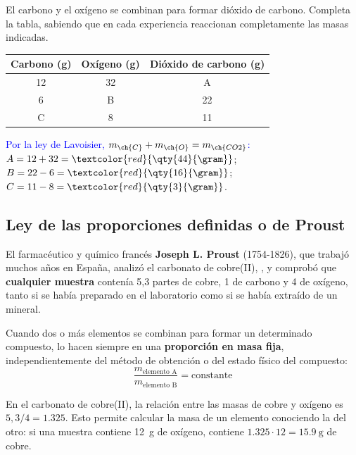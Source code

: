 \begin{exercise}
    El carbono y el oxígeno se combinan para formar dióxido de carbono. Completa la tabla, sabiendo que en cada experiencia
    reaccionan completamente las masas indicadas.
    \begin{center}
        \begin{tabular}{@{}ccc@{}}
            \toprule
            \textbf{Carbono (g)} & \textbf{Oxígeno (g)} & \textbf{Dióxido de carbono (g)} \\
            \midrule
            12 & 32 & A \\[3pt]
            6 & B & 22 \\[3pt]
            C & 8 & 11 \\
            \bottomrule
        \end{tabular}
    \end{center}
    \begin{solu}
        \textcolor{blue}{Por la ley de Lavoisier, \(m_{\ch{C}} + m_{\ch{O}} = m_{\ch{CO2}}\):}
        \(A = 12 + 32 = \textcolor{red}{\qty{44}{\gram}}\); \(B = 22 - 6 = \textcolor{red}{\qty{16}{\gram}}\);
        \(C = 11 - 8 = \textcolor{red}{\qty{3}{\gram}}\).
    \end{solu}
\end{exercise}

\subsection{Ley de las proporciones definidas o de Proust}

El farmacéutico y químico francés \textbf{Joseph L. Proust} (1754-1826), que trabajó muchos años en España, analizó el
carbonato de cobre(II), , y comprobó que \textbf{cualquier muestra} contenía 5,3 partes de cobre, 1 de carbono y 4
de oxígeno, tanto si se había preparado en el laboratorio como si se había extraído de un mineral.

\begin{definition}
    Cuando dos o más elementos se combinan para formar un determinado compuesto, lo hacen siempre en una
    \textbf{proporción en masa fija}, independientemente del método de obtención o del estado físico del compuesto:
    \[ \frac{m_{\text{elemento A}}}{m_{\text{elemento B}}} = \text{constante} \]
\end{definition}

En el carbonato de cobre(II), la relación entre las masas de cobre y oxígeno es \(5{,}3/4 = \num{1.325}\). Esto permite
calcular la masa de un elemento conociendo la del otro: si una muestra contiene \qty{12}{\gram} de oxígeno, contiene
\(\num{1.325} \cdot 12 = \qty{15.9}{\gram}\) de cobre.

